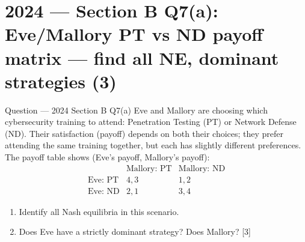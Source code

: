 \documentclass[12pt,a4paper]{article}
\begin{document}
\section{2024 --- Section B Q7(a): Eve/Mallory PT vs ND payoff matrix --- find all NE, dominant strategies (3)}

\begin{qbox}{Question --- 2024 Section B Q7(a)}
Eve and Mallory are choosing which cybersecurity training to attend: Penetration Testing (PT) or Network Defense (ND). Their satisfaction (payoff) depends on both their choices; they prefer attending the same training together, but each has slightly different preferences. The payoff table shows (Eve's payoff, Mallory's payoff):
\[
\begin{array}{c|cc}
 & \text{Mallory: PT} & \text{Mallory: ND} \\\hline
\text{Eve: PT} & 4,3 & 1,2 \\
\text{Eve: ND} & 2,1 & 3,4
\end{array}
\]
\begin{enumerate}[label=(\roman*)]
  \item Identify all Nash equilibria in this scenario.
  \item Does Eve have a strictly dominant strategy? Does Mallory? \hfill [3]
\end{enumerate}
\end{qbox}
\end{document}
